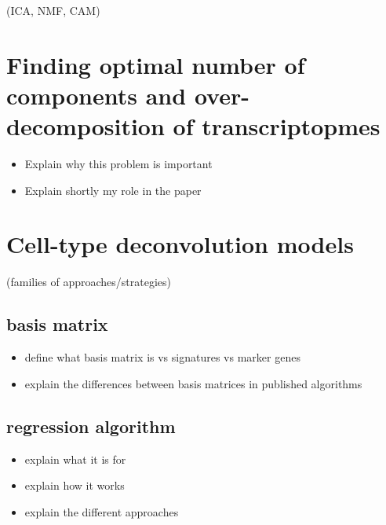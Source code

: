 \documentclass[12pt,]{book}
\providecommand{\tightlist}{%
  \setlength{\itemsep}{0pt}\setlength{\parskip}{0pt}}
\theoremstyle{definition}
\theoremstyle{definition}
\theoremstyle{definition}
\theoremstyle{remark}
\begin{document}
(ICA, NMF, CAM)

\hypertarget{finding-optimal-number-of-components-and-over-decomposition-of-transcriptopmes}{%
\section{Finding optimal number of components and over-decomposition of
transcriptopmes}\label{finding-optimal-number-of-components-and-over-decomposition-of-transcriptopmes}}

\begin{itemize}
\tightlist
\item
  Explain why this problem is important
\item
  Explain shortly my role in the paper
\end{itemize}

\citep{Ulykbek2017}



\hypertarget{cell-type-deconvolution-models}{%
\section{Cell-type deconvolution
models}\label{cell-type-deconvolution-models}}

(families of approaches/strategies)

\hypertarget{basis-matrix}{%
\subsection{basis matrix}\label{basis-matrix}}

\begin{itemize}
\tightlist
\item
  define what basis matrix is vs signatures vs marker genes
\item
  explain the differences between basis matrices in published algorithms
\end{itemize}

\hypertarget{regression-algorithm}{%
\subsection{regression algorithm}\label{regression-algorithm}}

\begin{itemize}
\tightlist
\item
  explain what it is for
\item
  explain how it works
\item
  explain the different approaches
\end{itemize}
\end{document}

